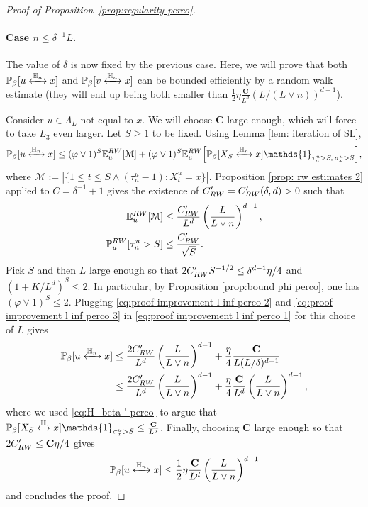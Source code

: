 \documentclass[11pt,a4paper]{article}
\numberwithin{equation}{section}
\theoremstyle{plain}
\theoremstyle{definition}
\newcommand\bfC{\mathbf{C}}
\newcommand{\connect}{\xleftrightarrow}
\begin{document}
\begin{proof}[Proof of Proposition~\textup{\ref{prop:regularity perco}}]
\paragraph{Case $n\leq\delta^{-1}L$.} The value of $\delta$ is now fixed by the previous case. Here, we will prove that both $\mathbb P_\beta[u\connect{\mathbb H_n\:}x]$ and $\mathbb P_\beta[v\connect{\mathbb H_n\:}x]$ can be bounded efficiently by a random walk estimate (they will end up being both smaller than $\tfrac12 \eta\frac{\bfC}{L^d}\left(L/(L\vee n)\right)^{d-1}$). 

Consider $u\in \Lambda_L$ not equal to $x$. We will choose $\bfC$ large enough, which will force to take $L_3$ even larger. Let $S\geq 1$ to be fixed. Using Lemma \ref{lem: iteration of SL},
\begin{equation}\label{eq:proof improvement l inf perco 1}
	\mathbb P_\beta[u\connect{\mathbb H_n\:}x]\leq (\varphi\vee 1)^S\mathbb E^{\rm RW}_{u}[\mathcal M]+(\varphi\vee 1)^S\mathbb E^{\rm RW}_{u}\Big[\mathbb P_\beta[X_S\connect{\mathbb H_n\:}x]\mathds{1}_{\tau_n^u>S, \: \sigma^u_x>S}\Big],
\end{equation}
where $\mathcal M:=|\{1\leq t\leq S\wedge (\tau_n^u-1) : X_t^u=x\}|$. Proposition \ref{prop: rw estimates 2} applied to $C=\delta^{-1}+1$ gives the existence of $C_{\rm RW}'=C_{\rm RW}'(\delta,d)>0$ such that
\begin{align}
	\mathbb E^{\rm RW}_{u}[\mathcal M]&\leq \frac{C_{\rm RW}'}{L^d}\left(\frac{L}{L\vee n}\right)^{d-1},\label{eq:proof improvement l inf perco 2}\\
	\mathbb P^{\rm RW}_{u}[\tau^u_n>S]&\le \frac{C_{\rm RW}'}{\sqrt{S}}.\label{eq:proof improvement l inf perco 3}
\end{align}
Pick $S$ and then $L$ large enough so that $2C_{\rm RW}'S^{-1/2}\leq \delta^{d-1}\eta/4$ and $(1+K/L^d)^S\leq 2$. In particular, by Proposition \ref{prop:bound phi perco}, one has $(\varphi\vee 1)^S\leq 2$. Plugging \eqref{eq:proof improvement l inf perco 2} and \eqref{eq:proof improvement l inf perco 3} in \eqref{eq:proof improvement l inf perco 1} for this choice of $L$ gives
\begin{align}\notag
	\mathbb P_\beta[u\connect{\mathbb H_n\:}x]&\leq \frac{2C_{\rm RW}'}{L^d}\left(\frac{L}{L\vee n}\right)^{d-1}+\frac{\eta}{4}\frac{\bfC}{L(L/\delta)^{d-1}}
	\\&\leq \frac{2C_{\rm RW}'}{L^d}\left(\frac{L}{L\vee n}\right)^{d-1}+\frac{\eta}{4}\frac{\bfC}{L^d}\left(\frac{L}{L\vee n}\right)^{d-1} ,
\end{align}
where we used \eqref{eq:H_beta-' perco} to argue that $\mathbb P_\beta[X_S\connect{\mathbb H\:}x]\mathds{1}_{\sigma^u_x>S}\leq \tfrac{\bfC}{L^d}$.
Finally, choosing $\bfC$ large enough so that $2C_{\rm RW}'\leq \bfC \eta/4$ gives
\begin{equation}
	\mathbb P_\beta[u\connect{\mathbb H_n\:}x]\leq \frac12\eta\frac{\bfC}{L^d}\left(\frac{L}{L\vee n}\right)^{d-1}
\end{equation}
and concludes the proof.
\end{proof}
%
\end{document}
